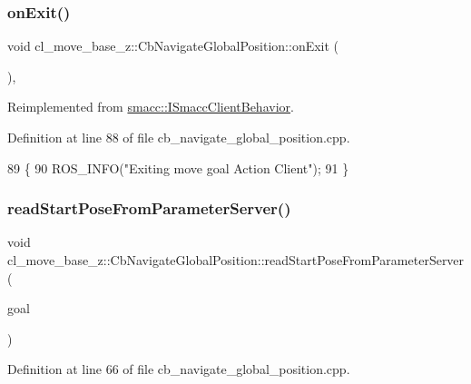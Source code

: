 \subsubsection{\texorpdfstring{on\+Exit()}{onExit()}}
{\footnotesize\ttfamily void cl\+\_\+move\+\_\+base\+\_\+z\+::\+Cb\+Navigate\+Global\+Position\+::on\+Exit (\begin{DoxyParamCaption}{ }\end{DoxyParamCaption})\hspace{0.3cm}{\ttfamily [override]}, {\ttfamily [virtual]}}



Reimplemented from \hyperlink{classsmacc_1_1ISmaccClientBehavior_a36bf771905e3bf750909a15e4215a9b3}{smacc\+::\+I\+Smacc\+Client\+Behavior}.



Definition at line 88 of file cb\+\_\+navigate\+\_\+global\+\_\+position.\+cpp.


\begin{DoxyCode}
89 \{
90   ROS\_INFO(\textcolor{stringliteral}{"Exiting move goal Action Client"});
91 \}
\end{DoxyCode}
\mbox{\label{classcl__move__base__z_1_1CbNavigateGlobalPosition_a868b25f238e3781c9a2e44b4e1502fcc}} 
\subsubsection{\texorpdfstring{read\+Start\+Pose\+From\+Parameter\+Server()}{readStartPoseFromParameterServer()}}
{\footnotesize\ttfamily void cl\+\_\+move\+\_\+base\+\_\+z\+::\+Cb\+Navigate\+Global\+Position\+::read\+Start\+Pose\+From\+Parameter\+Server (\begin{DoxyParamCaption}\item[{Cl\+Move\+Base\+Z\+::\+Goal \&}]{goal }\end{DoxyParamCaption})}



Definition at line 66 of file cb\+\_\+navigate\+\_\+global\+\_\+position.\+cpp.



